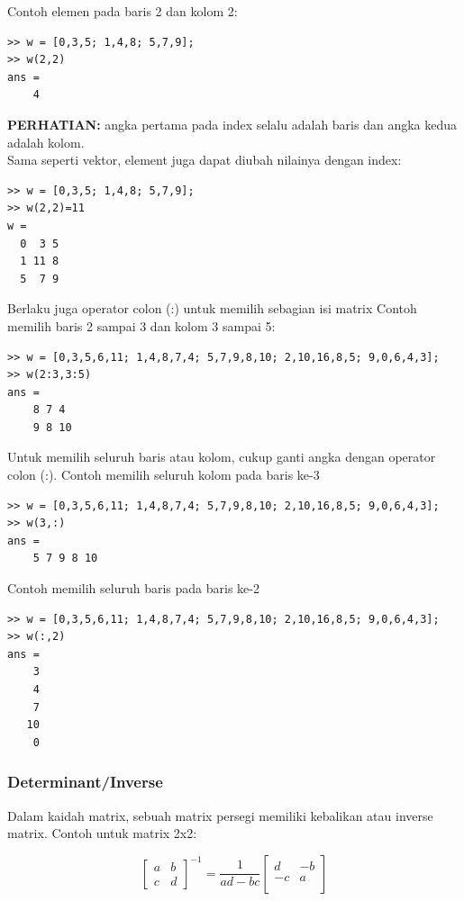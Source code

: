\documentclass[12pt]{book}
\begin{document}
	Contoh elemen pada baris 2 dan kolom 2:
	\begin{verbatim}
>> w = [0,3,5; 1,4,8; 5,7,9];
>> w(2,2)
ans =
    4
	\end{verbatim}

	\textbf{PERHATIAN:} angka pertama pada index selalu adalah baris dan angka kedua adalah kolom.\\

	Sama seperti vektor, element juga dapat diubah nilainya dengan index:
	\begin{verbatim}
>> w = [0,3,5; 1,4,8; 5,7,9];
>> w(2,2)=11
w = 
  0  3 5
  1 11 8
  5  7 9
	\end{verbatim}

	Berlaku juga operator colon (:) untuk memilih sebagian isi matrix
	Contoh memilih baris 2 sampai 3 dan kolom 3 sampai 5:
	\begin{verbatim}
>> w = [0,3,5,6,11; 1,4,8,7,4; 5,7,9,8,10; 2,10,16,8,5; 9,0,6,4,3];
>> w(2:3,3:5)
ans =
    8 7 4
    9 8 10
	\end{verbatim}

	Untuk memilih seluruh baris atau kolom, cukup ganti angka dengan operator colon (:).
	Contoh memilih seluruh kolom pada baris ke-3
	\begin{verbatim}
>> w = [0,3,5,6,11; 1,4,8,7,4; 5,7,9,8,10; 2,10,16,8,5; 9,0,6,4,3];
>> w(3,:)
ans =
    5 7 9 8 10
	\end{verbatim}

	Contoh memilih seluruh baris pada baris ke-2
	\begin{verbatim}
>> w = [0,3,5,6,11; 1,4,8,7,4; 5,7,9,8,10; 2,10,16,8,5; 9,0,6,4,3];
>> w(:,2)
ans =
    3
    4
    7
   10
    0
	\end{verbatim}
	
	\subsubsection{Determinant/Inverse}
	
	Dalam kaidah matrix, sebuah matrix persegi memiliki kebalikan atau inverse matrix.
	Contoh untuk matrix 2x2:
	
	\[
	\begin{bmatrix}
		a & b\\
		c & d
	\end{bmatrix}^{-1}
	=
	\frac{1}{ad-bc}
	\begin{bmatrix}
		d & -b \\
		-c & a\\
	\end{bmatrix}
	\]
	
\end{document}
